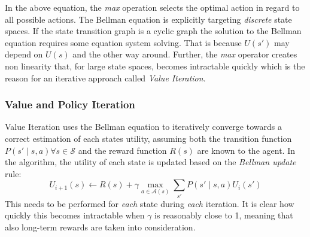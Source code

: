 In the above equation, the \emph{max} operation selects the optimal action in regard to all possible actions. The
Bellman equation is explicitly targeting \emph{discrete} state spaces. If the state transition graph is a cyclic graph
the solution to the Bellman equation requires some equation system solving. That is because $U(s')$ may depend on $U(s)$
and the other way around. Further, the \emph{max} operator creates non linearity that, for large state spaces, becomes
intractable quickly which is the reason for an iterative approach called \emph{Value Iteration}.







\subsubsection{Value and Policy Iteration}%
\label{sub:policy_and_value_iteration}

Value Iteration uses the Bellman equation to iteratively converge towards a correct estimation of each states utility,
assuming both the transition function $P(s' \mid s,a) \forall s \in \mathcal{S}$ and the reward function $R(s)$ are
known to the agent.
In the algorithm, the utility of each state is updated based on the \emph{Bellman update} rule:
\begin{equation}
    U_{i+1}(s) \gets R(s) + \gamma \max_{a \in \mathcal{A}(s)} \sum_{s'}{P(s' \mid s,a) U_i(s')}
\end{equation}
This needs to be performed for \emph{each} state during \emph{each} iteration. It is clear how quickly this becomes
intractable when $\gamma$ is reasonably close to 1, meaning that also long-term rewards are taken into
consideration.

